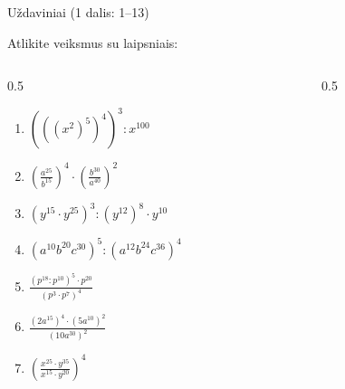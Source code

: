 \documentclass[aspectratio=169,10pt]{beamer}
\begin{document}
\begin{frame}{Uždaviniai (1 dalis: 1--13)}

    Atlikite veiksmus su laipsniais:

    \vspace{0.2cm}

    \begin{columns}[T]

        \begin{column}{0.5\textwidth}

            \begin{enumerate}

                \item
                $(((x^2)^5)^4)^3:x^{100}$

                \item
                $\left(\frac{a^{25}}{b^{15}}\right)^4
                \cdot
                \left(\frac{b^{30}}{a^{40}}\right)^2$

                \item
                $(y^{15}\cdot y^{25})^3:(y^{12})^8\cdot y^{10}$

                \item
                $(a^{10}b^{20}c^{30})^5:
                (a^{12}b^{24}c^{36})^4$

                \item
                $\frac{
                (p^{18}:p^{10})^5\cdot p^{20}
                }{
                (p^3\cdot p^7)^4
                }$

                \item
                $\frac{
                (2a^{15})^4\cdot(5a^{10})^2
                }{
                (10a^{30})^2
                }$

                \item
                $\left(
                \frac{x^{25}\cdot y^{35}}
                {x^{15}\cdot y^{20}}
                \right)^4$

            \end{enumerate}

        \end{column}

        \begin{column}{0.5\textwidth}

            \begin{enumerate}


\end{enumerate}
\end{column}
\end{columns}
\end{frame}
\end{document}
